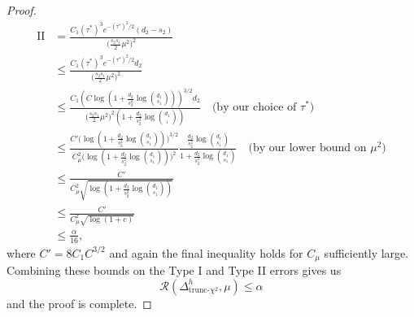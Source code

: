 \documentclass{article}
\newcommand{\cR}{\mathcal{R}}
\newcommand{\chisqlin}{\text{trunc-$\chi^2$}}
\theoremstyle{remark}
\begin{document}
\begin{proof}
    \begin{align*}
        \text{II} &= \frac{C_1 (\tau^*)^3e^{-(\tau^*)^2/2}(d_2 - s_2)}{\big(\frac{s_2s_1}{2}\mu^2\big)^2} \\
        &\leq \frac{C_1 (\tau^*)^3e^{-(\tau^*)^2/2}d_2}{\big(\frac{s_2s_1}{2}\mu^2\big)^2} \\
        &\leq \frac{C_1 (C \log(1 + \frac{d_2}{s_2^2}\log {d_1 \choose s_1}))^{3/2}d_2}{\big(\frac{s_2s_1}{2}\mu^2\big)^2(1 + \frac{d_2}{s_2^2}\log {d_1 \choose _1})} \quad \text{(by our choice of $\tau^*$)} \\
        &\leq \frac{C'\big(\log(1 + \frac{d_2}{s_2^2}\log {d_1 \choose s_1})\big)^{3/2}}{C_\mu^2\big(\log(1 + \frac{d_2}{s_2^2}\log {d_1 \choose s_1})\big)^2}\frac{\frac{d_2}{s_2^2}\log {d_1 \choose s_1}}{1 + \frac{d_2}{s_2^2}\log {d_1 \choose s_1}} \quad \text{(by our lower bound on $\mu^2$)}\\ 
        &\leq \frac{C'}{C_\mu^2 \sqrt{\log(1 + \frac{d_2}{s_2^2}\log {d_1 \choose s_1})}} \\
        &\leq \frac{C'}{C_\mu^2 \sqrt{\log(1 + c)}} \\
        &\leq \frac{\alpha}{16},
    \end{align*}
    where $C' = 8C_1C^{3/2}$ and again the final inequality holds for $C_\mu$ sufficiently large. Combining these bounds on the Type I and Type II errors gives us
    \[\cR(\Delta_{\chisqlin}^h, \mu) \leq \alpha\]
    and the proof is complete.
\end{proof}
\end{document}

